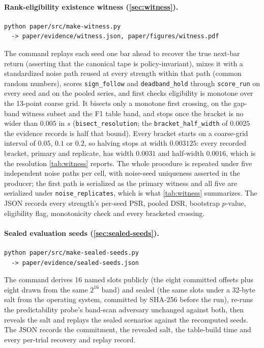 \paragraph{Rank-eligibility existence witness (\cref{sec:witness}).}
\begin{verbatim}
python paper/src/make-witness.py
  -> paper/evidence/witness.json, paper/figures/witness.pdf
\end{verbatim}
The command replays each seed one bar ahead to recover the true next-bar return (asserting that the canonical tape is policy-invariant), mixes it with a standardized noise path reused at every strength within that path (common random numbers), scores \texttt{sign\_follow} and \texttt{deadband\_hold} through \texttt{score\_run} on every seed and on the pooled series, and first checks eligibility is monotone over the 13-point coarse grid. It bisects only a monotone first crossing, on the gap-band witness subset and the F1 table band, and stops once the bracket is no wider than $0.005$ in $s$ (\texttt{bisect\_resolution}; the \texttt{bracket\_half\_width} of $0.0025$ the evidence records is half that bound). Every bracket starts on a coarse-grid interval of $0.05$, $0.1$ or $0.2$, so halving stops at width $0.003125$: every recorded bracket, primary and replicate, has width $0.0031$ and half-width $0.0016$, which is the resolution \cref{tab:witness} reports. The whole procedure is repeated under five independent noise paths per cell, with noise-seed uniqueness asserted in the producer; the first path is serialized as the primary witness and all five are serialized under \texttt{noise\_replicates}, which is what \cref{tab:witness} summarizes. The JSON records every strength's per-seed PSR, pooled DSR, bootstrap $p$-value, eligibility flag, monotonicity check and every bracketed crossing.

\paragraph{Sealed evaluation seeds (\cref{sec:sealed-seeds}).}
\begin{verbatim}
python paper/src/make-sealed-seeds.py
  -> paper/evidence/sealed-seeds.json
\end{verbatim}
The command derives 16 named slots publicly (the eight committed offsets plus eight drawn from the same $2^{16}$ band) and sealed (the same slots under a 32-byte salt from the operating system, committed by SHA-256 before the run), re-runs the predictability probe's band-scan adversary unchanged against both, then reveals the salt and replays the sealed scenarios against the recomputed seeds. The JSON records the commitment, the revealed salt, the table-build time and every per-trial recovery and replay record.

